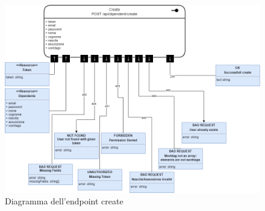 \documentclass{report}
\begin{document}
\begin{figure}[H]
	\centering\includegraphics[width=1\textwidth]{images/microservizio-dipendenti/diagrams/create_diagram.drawio.png}
	\caption{Diagramma dell'endpoint create}
\end{figure}
\end{document}
